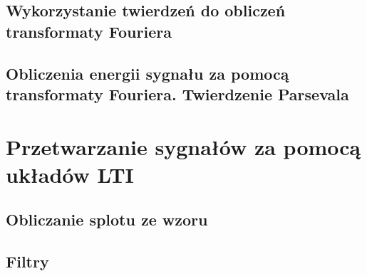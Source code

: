 \documentclass[a4paper,11pt]{LambBook} %
\begin{document}
\section{Wykorzystanie twierdzeń do obliczeń transformaty Fouriera}

\section{Obliczenia energii sygnału za pomocą transformaty Fouriera. Twierdzenie Parsevala}
\chapter{Przetwarzanie sygnałów za pomocą układów LTI}
\section{Obliczanie splotu ze wzoru}
\section{Filtry}

\label{page:lastpage}

\end{document}
